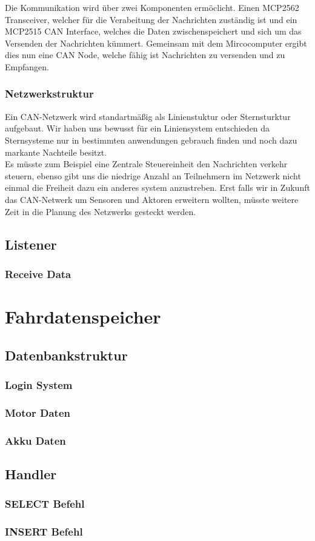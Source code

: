 Die Kommunikation wird über zwei Komponenten ermöclicht. Einen MCP2562 Transceiver, welcher für die Verabeitung der Nachrichten zuständig ist und ein MCP2515 CAN Interface, welches die Daten zwischenspeichert und sich um das Versenden der Nachrichten kümmert. Gemeinsam mit dem Mircocomputer ergibt dies nun eine CAN Node, welche fähig ist Nachrichten zu versenden und zu Empfangen.
\subsubsection{Netzwerkstruktur}
Ein CAN-Netzwerk wird standartmäßig als Linienstuktur oder Sternsturktur aufgebaut. Wir haben uns bewusst für ein Liniensystem entschieden da Sternsysteme nur in bestimmten anwendungen gebrauch finden und noch dazu markante Nachteile besitzt.\\ Es müsste zum Beispiel eine Zentrale Steuereinheit den Nachrichten verkehr steuern, ebenso gibt uns die niedrige Anzahl an Teilnehmern im Netzwerk nicht einmal die Freiheit dazu ein anderes system anzustreben. Erst falls wir in Zukunft das CAN-Netwerk um Sensoren und Aktoren erweitern wollten, müsste weitere Zeit in die Planung des Netzwerks gesteckt werden. 

\newpage

\subsection{Listener}
\subsubsection{Receive Data}



\section{Fahrdatenspeicher}
\subsection{Datenbankstruktur}
\subsubsection{Login System}
\subsubsection{Motor Daten}
\subsubsection{Akku Daten}
\subsection{Handler}
\subsubsection{SELECT Befehl}
\subsubsection{INSERT Befehl}

\newpage
